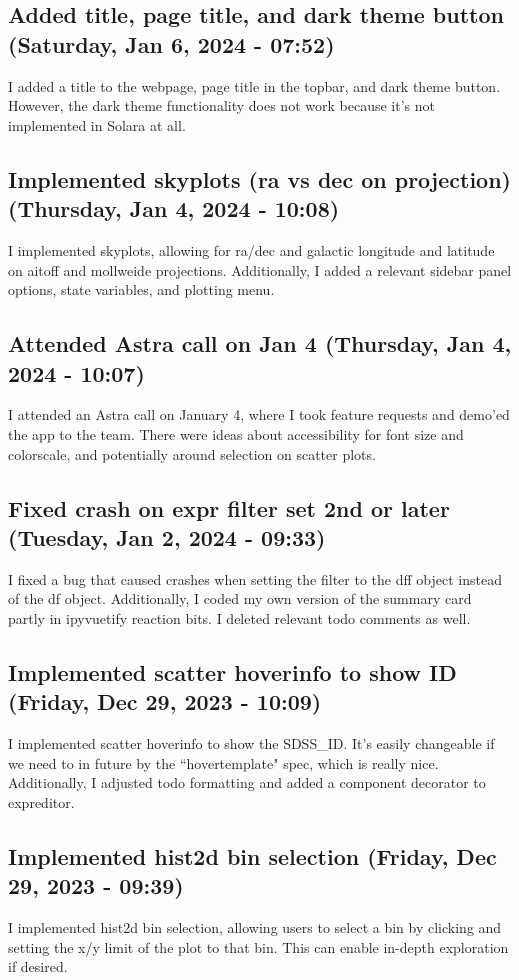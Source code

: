 \documentclass[a4paper]{article}
\begin{document}
\subsection*{Added title, page title, and dark theme button (Saturday, Jan 6, 2024 - 07:52)}
I added a title to the webpage, page title in the topbar, and dark theme button. However, the dark theme functionality does not work because it's not implemented in Solara at all.

\subsection*{Implemented skyplots (ra vs dec on projection) (Thursday, Jan 4, 2024 - 10:08)}
I implemented skyplots, allowing for ra/dec and galactic longitude and latitude on aitoff and mollweide projections. Additionally, I added a relevant sidebar panel options, state variables, and plotting menu.

\subsection*{Attended Astra call on Jan 4 (Thursday, Jan 4, 2024 - 10:07)}
I attended an Astra call on January 4, where I took feature requests and demo'ed the app to the team. There were ideas about accessibility for font size and colorscale, and potentially around selection on scatter plots.

\subsection*{Fixed crash on expr filter set 2nd or later (Tuesday, Jan 2, 2024 - 09:33)}
I fixed a bug that caused crashes when setting the filter to the dff object instead of the df object. Additionally, I coded my own version of the summary card partly in ipyvuetify reaction bits. I deleted relevant todo comments as well.

\subsection*{Implemented scatter hoverinfo to show ID (Friday, Dec 29, 2023 - 10:09)}
I implemented scatter hoverinfo to show the SDSS\_ID. It's easily changeable if we need to in future by the ``hovertemplate" spec, which is really nice. Additionally, I adjusted todo formatting and added a component decorator to expreditor.

\subsection*{Implemented hist2d bin selection (Friday, Dec 29, 2023 - 09:39)}
I implemented hist2d bin selection, allowing users to select a bin by clicking and setting the x/y limit of the plot to that bin. This can enable in-depth exploration if desired.
\end{document}
